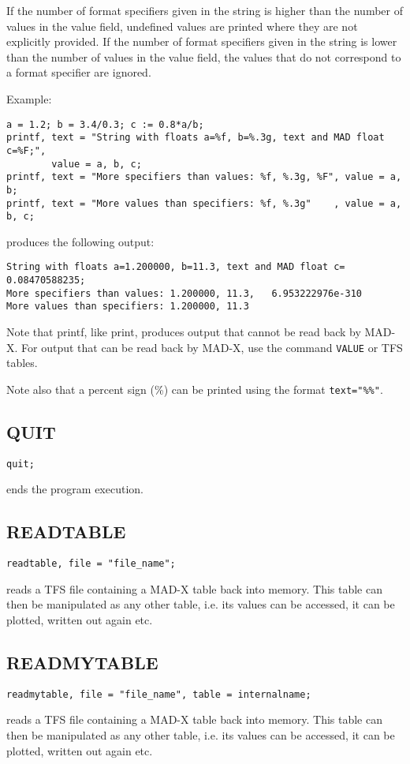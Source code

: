 If the number of format specifiers given in the string is higher 
than the number of values in the value field, undefined values are printed 
where they are not explicitly provided. 
If the number of format specifiers given in the string is lower 
than the number of values in the value field, the values that 
do not correspond to a format specifier are ignored. 


Example:
\begin{verbatim}
a = 1.2; b = 3.4/0.3; c := 0.8*a/b;
printf, text = "String with floats a=%f, b=%.3g, text and MAD float c=%F;", 
        value = a, b, c;
printf, text = "More specifiers than values: %f, %.3g, %F", value = a, b;
printf, text = "More values than specifiers: %f, %.3g"    , value = a, b, c;
\end{verbatim}
produces the following output:
\begin{verbatim}
String with floats a=1.200000, b=11.3, text and MAD float c=     0.08470588235;
More specifiers than values: 1.200000, 11.3,   6.953222976e-310
More values than specifiers: 1.200000, 11.3
\end{verbatim}

Note that printf, like print, produces output that cannot be read back
by MAD-X. For output that can be read back by MAD-X, use the command
{\tt VALUE} or TFS tables.

Note also that a percent sign (\%) can be printed using the format
\verb|text="%%"|. 

\subsection{QUIT}
\begin{verbatim}
quit;
\end{verbatim} 
ends the program execution. 


\subsection{READTABLE}
\begin{verbatim}
readtable, file = "file_name";
\end{verbatim} 
reads a TFS file containing a MAD-X table back into memory. This table
can then be manipulated as any other table, i.e. its values can be
accessed, it can be plotted, written out again etc.  


\subsection{READMYTABLE}
\label{subsec:general_readmy}
\begin{verbatim}
readmytable, file = "file_name", table = internalname;
\end{verbatim} 
reads a TFS file containing a MAD-X table back into memory. This table
can then be manipulated as any other table, i.e. its values can be
accessed, it can be plotted, written out again etc. 

